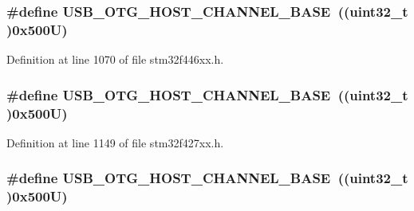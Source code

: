 \subsubsection[{\texorpdfstring{U\+S\+B\+\_\+\+O\+T\+G\+\_\+\+H\+O\+S\+T\+\_\+\+C\+H\+A\+N\+N\+E\+L\+\_\+\+B\+A\+SE}{USB_OTG_HOST_CHANNEL_BASE}}]{\setlength{\rightskip}{0pt plus 5cm}\#define U\+S\+B\+\_\+\+O\+T\+G\+\_\+\+H\+O\+S\+T\+\_\+\+C\+H\+A\+N\+N\+E\+L\+\_\+\+B\+A\+SE~((uint32\+\_\+t )0x500\+U)}\hypertarget{group___peripheral__memory__map_ga942c8c5241b80fbcf638fea0fa18bebd}{}\label{group___peripheral__memory__map_ga942c8c5241b80fbcf638fea0fa18bebd}


Definition at line 1070 of file stm32f446xx.\+h.

\subsubsection[{\texorpdfstring{U\+S\+B\+\_\+\+O\+T\+G\+\_\+\+H\+O\+S\+T\+\_\+\+C\+H\+A\+N\+N\+E\+L\+\_\+\+B\+A\+SE}{USB_OTG_HOST_CHANNEL_BASE}}]{\setlength{\rightskip}{0pt plus 5cm}\#define U\+S\+B\+\_\+\+O\+T\+G\+\_\+\+H\+O\+S\+T\+\_\+\+C\+H\+A\+N\+N\+E\+L\+\_\+\+B\+A\+SE~((uint32\+\_\+t )0x500\+U)}\hypertarget{group___peripheral__memory__map_ga942c8c5241b80fbcf638fea0fa18bebd}{}\label{group___peripheral__memory__map_ga942c8c5241b80fbcf638fea0fa18bebd}


Definition at line 1149 of file stm32f427xx.\+h.

\subsubsection[{\texorpdfstring{U\+S\+B\+\_\+\+O\+T\+G\+\_\+\+H\+O\+S\+T\+\_\+\+C\+H\+A\+N\+N\+E\+L\+\_\+\+B\+A\+SE}{USB_OTG_HOST_CHANNEL_BASE}}]{\setlength{\rightskip}{0pt plus 5cm}\#define U\+S\+B\+\_\+\+O\+T\+G\+\_\+\+H\+O\+S\+T\+\_\+\+C\+H\+A\+N\+N\+E\+L\+\_\+\+B\+A\+SE~((uint32\+\_\+t )0x500\+U)}\hypertarget{group___peripheral__memory__map_ga942c8c5241b80fbcf638fea0fa18bebd}{}\label{group___peripheral__memory__map_ga942c8c5241b80fbcf638fea0fa18bebd}


